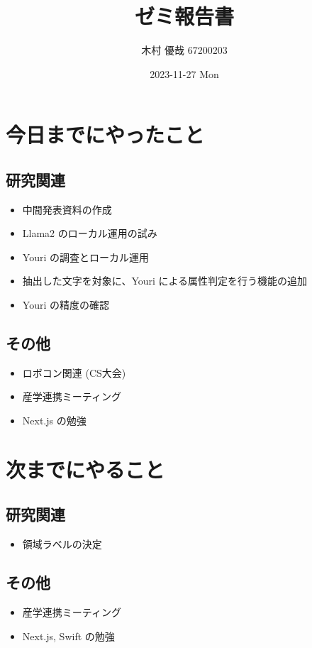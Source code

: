 \documentclass[uplatex, onecolumn, 10pt]{jsarticle}
\begin{document}
\title{\vspace{-40mm}\bf{\LARGE{ゼミ報告書}}}
\author{\vspace{-40mm}木村 優哉 67200203}
\date{2023-11-27 Mon}
\maketitle


\section{今日までにやったこと}

\subsection*{研究関連}
\begin{itemize}
	\item 中間発表資料の作成
	\item Llama2 のローカル運用の試み
	\item Youri の調査とローカル運用
	\item 抽出した文字を対象に、Youri による属性判定を行う機能の追加
	\item Youri の精度の確認
\end{itemize}

\subsection*{その他}
\begin{itemize}
	\item ロボコン関連 (CS大会)
	\item 産学連携ミーティング
	\item Next.js の勉強
\end{itemize}


\section{次までにやること}

\subsection*{研究関連}
\begin{itemize}
	\item 領域ラベルの決定
\end{itemize}

\subsection*{その他}
\begin{itemize}
	\item 産学連携ミーティング
	\item Next.js, Swift の勉強
\end{itemize}
\end{document}
